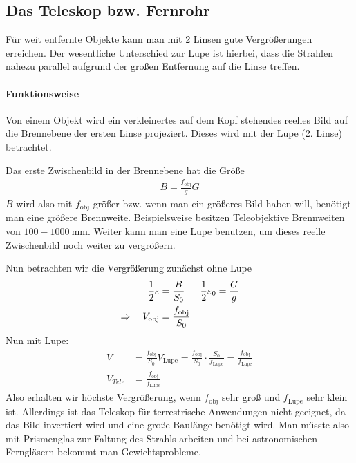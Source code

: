 
\subsection{Das Teleskop bzw. Fernrohr}
Für weit entfernte Objekte kann man mit 2 Linsen gute Vergrößerungen
erreichen. Der wesentliche Unterschied zur Lupe ist hierbei, dass die
Strahlen nahezu parallel aufgrund der großen Entfernung auf die Linse
treffen.

\paragraph{Funktionsweise}
Von einem Objekt wird ein verkleinertes auf dem Kopf stehendes reelles
Bild auf die Brennebene der ersten Linse projeziert. Dieses wird mit
der Lupe (2. Linse) betrachtet.

Das erste Zwischenbild in der Brennebene hat die Größe
\begin{align*}
	B = \frac{f_\text{obj}}{g}G
\end{align*}
$B$ wird also mit $f_\text{obj}$ größer bzw. wenn man ein größeres Bild
haben will, benötigt man eine größere Brennweite. Beispielsweise
besitzen Teleobjektive Brennweiten von
$\num{100}-\SI{1000}{\milli\meter}$.
Weiter kann man eine Lupe benutzen, um dieses reelle Zwischenbild noch
weiter zu vergrößern.

Nun betrachten wir die Vergrößerung zunächst ohne Lupe
\begin{align*}
  \frac{1}{2}\varepsilon &= \frac{B}{S_0} 
  &\frac{1}{2}\varepsilon_0 &=\frac{G}{g}\\
  \Rightarrow\quad V_\text{obj} &=\frac{f_\text{obj}}{S_0}
\end{align*}
Nun mit Lupe:
\begin{align*}
  V &= \frac{f_\text{obj}}{S_0}V_\text{Lupe}
      =\frac{f_\text{obj}}{S_0} \cdot \frac{S_0}{f_\text{Lupe}}
      =\frac{f_\text{obj}}{f_\text{Lupe}}\\
  V_{Tele} &=\frac{f_\text{obj}}{f_\text{Lupe}}
\end{align*}
Also erhalten wir höchste Vergrößerung, wenn $f_\text{obj}$ sehr groß und
$f_\text{Lupe}$ sehr klein ist. Allerdings ist das Teleskop für
terrestrische Anwendungen nicht geeignet, da das Bild invertiert wird
und eine große Baulänge benötigt wird. Man müsste also mit Prismenglas
zur Faltung des Strahls arbeiten und bei astronomischen Ferngläsern
bekommt man Gewichtsprobleme. 

